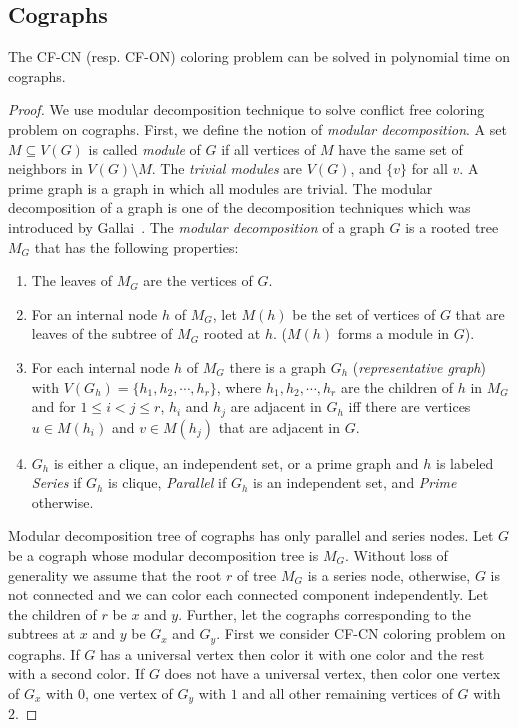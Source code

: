 \documentclass[svgnames]{llncs}
\newcommand{\cfcn}{\textsc {CF-CN}}
\newcommand{\cfon}{\textsc {CF-ON}}
\begin{document}
\subsection{Cographs}
\begin{theorem}\label{th-cographs}
The \cfcn{} (resp. \cfon{}) coloring problem can be solved in polynomial time on cographs.
\end{theorem}
\begin{proof}
We use modular decomposition \cite{habib2010survey} technique to solve conflict free coloring problem on cographs. 
First, we define the notion of \emph{modular decomposition}.
A set $M \subseteq V(G)$ is called {\it module} of $G$ if all vertices of $M$ have the same set 
of neighbors in $V(G)\setminus M$.  
The \emph{trivial modules} are $V(G)$, and $\{v\}$ for all $v$.
A prime  graph is a graph in which all
modules are trivial.
The modular decomposition of a graph is one of the decomposition techniques which was introduced by Gallai~\cite{gallai1967transitiv}. The {\it modular decomposition} of a graph $G$ is a rooted tree $M_G$ 
that has the following properties:
\begin{enumerate}
\setlength{\itemsep}{1pt}
\setlength{\parskip}{0pt}
 \item The leaves of $M_G$ are the vertices of $G$.
 \item For an internal node $h$ of $M_G$, let $M(h)$ be the set of vertices of $G$ that are leaves of the subtree of 
 $M_G$ rooted at $h$. ($M(h)$ forms a module in $G$).
 \item For each internal node $h$ of $M_G$ there is a graph $G_h$ (\emph{representative graph}) with 
 $V(G_h)=\{h_1,h_2,\cdots,h_r\}$, where $h_1,h_2,\cdots,h_r$ are the 
 children of $h$ in $M_G$ and for  $1 \leq i<j \leq r$, $h_i$ and $h_j$ are adjacent in $G_h$ iff there are vertices $u \in M(h_i)$ and $v \in M(h_j)$ that are adjacent in $G$.
 \item $G_h$ is either a clique, an independent set, or a prime graph and 
 $h$ is labeled \emph{Series} if $G_h$ is clique, \emph{Parallel} if $G_h$ is an independent set, and \emph{Prime} otherwise.
\end{enumerate}

Modular decomposition tree of cographs has only parallel and series nodes. 
Let $G$ be a cograph whose modular decomposition tree is $M_G$. Without loss of generality we assume that 
the root $r$ of tree $M_G$ is a series node, otherwise, $G$ is not connected and we can color each 
connected component independently. 
Let the children of $r$ be $x$ and $y$. Further, let the cographs corresponding to the subtrees at 
$x$ and $y$ be $G_x$ and $G_y$. 
First we consider \cfcn{} coloring problem on cographs. If $G$ has a universal vertex then color it with one color and the rest with a second color. If $G$ does not have a universal vertex, then color one vertex of $G_x$ with $0$, one vertex of $G_y$ with $1$ and all other remaining vertices of $G$ with $2$.


\end{proof}
\end{document}
